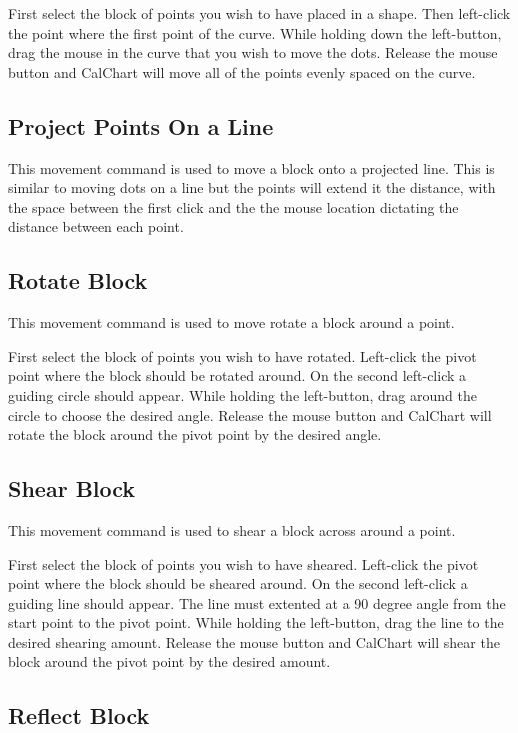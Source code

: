 First select the block of points you wish to have placed in a shape.  Then
left-click the point where the first point of the curve.  While
holding down the left-button, drag the mouse in the curve that you wish to move the dots.
Release the mouse button and CalChart will move all of the 
points evenly spaced on the curve.

\subsection{Project Points On a Line}\label{projectpointsonaline}

This movement command is used to move a block onto a projected line.  This is similar to moving dots on a line
but the points will extend it the distance, with the space between the first click and the the mouse location
dictating the distance between each point.

\subsection{Rotate Block}\label{rotateblock}

This movement command is used to move rotate a block around a point.

First select the block of points you wish to have rotated.  Left-click the 
pivot point where the block should be rotated around.  On the second left-click
a guiding circle should appear.  While holding the left-button, drag around
the circle to choose the desired angle.  Release the mouse button and CalChart
will rotate the block around the pivot point by the desired angle.

\subsection{Shear Block}\label{shearblock}

This movement command is used to shear a block across around a point.

First select the block of points you wish to have sheared.  Left-click the 
pivot point where the block should be sheared around.  On the second left-click
a guiding line should appear.  The line must extented at a 90 degree angle 
from the start point to the pivot point.   While holding the left-button, drag
the line to the desired shearing amount.  Release the mouse button and CalChart
will shear the block around the pivot point by the desired amount.

\subsection{Reflect Block}\label{reflectblock}


